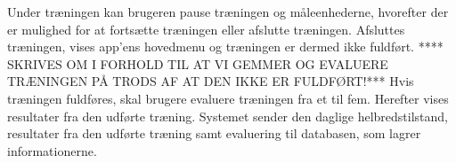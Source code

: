 Under træningen kan brugeren pause træningen og måleenhederne, hvorefter der er mulighed for at fortsætte træningen eller afslutte træningen. Afsluttes træningen, vises app'ens hovedmenu og træningen er dermed ikke fuldført. 
**** SKRIVES OM I FORHOLD TIL AT VI GEMMER OG EVALUERE TRÆNINGEN PÅ TRODS AF AT DEN IKKE ER FULDFØRT!*** Hvis træningen fuldføres, skal brugere evaluere træningen fra et til fem. Herefter vises resultater fra den udførte træning. Systemet sender den daglige helbredstilstand, resultater fra den udførte træning samt evaluering til databasen, som lagrer informationerne. 